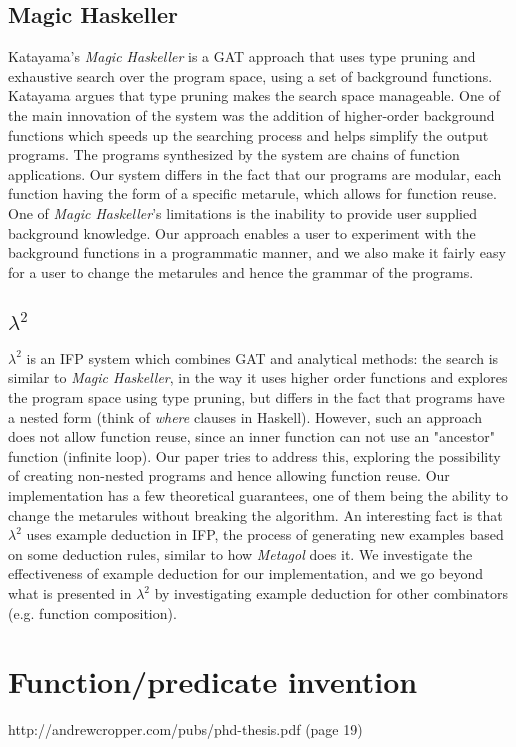 \subsection{Magic Haskeller}
\indent \indent Katayama's \textit{Magic Haskeller} \cite{mhask} is a GAT approach that uses type pruning and exhaustive search over the program space, using a set of background functions. Katayama argues that type pruning makes the search space manageable. One of the main innovation of the system was the addition of higher-order background functions which speeds up the searching process and helps simplify the output programs. The programs synthesized by the system are chains of function applications. Our system differs in the fact that our programs are modular, each function having the form of a specific metarule, which allows for function reuse. One of \textit{Magic Haskeller}'s limitations is the inability to provide user supplied background knowledge. Our approach enables a user to experiment with the background functions in a programmatic manner, and we also make it fairly easy for a user to change the metarules and hence the grammar of the programs.
\subsection{$\lambda^{2}$}
\indent \indent \textit{$\lambda^{2}$} \cite{lambdasq} is an IFP system which combines GAT and analytical methods: the search is similar to \textit{Magic Haskeller}, in the way it uses higher order functions and explores the program space using type pruning, but differs in the fact that programs have a nested form (think of \textit{where} clauses in Haskell). However, such an approach does not allow function reuse, since an inner function can not use an "ancestor" function (infinite loop). Our paper tries to address this, exploring the possibility of creating non-nested programs and hence allowing function reuse. Our implementation has a few theoretical guarantees, one of them being the ability to change the metarules without breaking the algorithm. An interesting fact is that $\lambda^{2}$ uses example deduction in IFP, the process of generating new examples based on some deduction rules, similar to how \textit{Metagol} does it. We investigate the effectiveness of example deduction for our implementation, and we go beyond what is presented in \textit{$\lambda^{2}$} by investigating example deduction for other combinators (e.g. function composition).

\section{Function/predicate invention}
\ac{http://andrewcropper.com/pubs/phd-thesis.pdf (page 19)}

